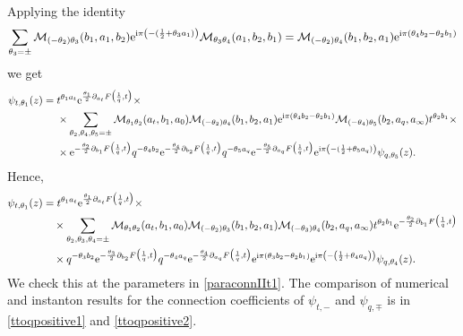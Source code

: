 \documentclass[11pt]{article}
\numberwithin{equation}{section}
\newcommand{\ri}{{\rm i}}
\newcommand{\E}{{\mathrm e}}
\begin{document}
Applying the identity
\begin{equation}
    \sum_{\theta_3=\pm}\mathcal{M}_{(-\theta_2)\theta_3}(b_1,a_1,b_2)\E^{\ri\pi\left(-(\frac1 2+\theta_3 a_1)\right)}\mathcal{M}_{\theta_3\theta_4}(a_1,b_2,b_1)=\mathcal{M}_{(-\theta_2)\theta_4}(b_1,b_2,a_1)\E^{\ri\pi(\theta_4 b_2-\theta_2 b_1)}
\end{equation}
we get
\begin{equation}
\begin{aligned}
\psi_{t,\theta_1}(z)
&=t^{\theta_1 a_t}\E^{\frac{\theta_1}{2}\partial_{a_t}F\big({1\over q},t\big)}\times\\
&\quad\ \times\sum_{\theta_2,\theta_4,\theta_5=\pm}\mathcal{M}_{\theta_1\theta_2}(a_t,b_1,a_0)\mathcal{M}_{(-\theta_2)\theta_4}(b_1,b_2,a_1)\E^{\ri\pi(\theta_4 b_2-\theta_2 b_1)}\mathcal{M}_{(-\theta_4)\theta_5}(b_2,a_q,a_\infty) t^{\theta_2 b_1}\times\\
&\quad\ \times \E^{-\frac{\theta_2}{2}\partial_{b_1}F\big({1\over q},t\big)} q^{-\theta_4 b_2}\E^{-\frac{\theta_4}{2}\partial_{b_2}F\big({1\over q},t\big)}q^{-\theta_5 a_q}\E^{-\frac{\theta_5}{2}\partial_{a_q}F\big({1\over q},t\big)}\E^{\ri\pi\left(-(\frac1 2 +\theta_5 a_q)\right)}\psi_{q,\theta_5}(z).
\end{aligned}
\end{equation}
Hence,
\begin{equation}\label{connIItq}
\begin{aligned}
\psi_{t,\theta_1}(z)
&= t^{\theta_1 a_t} \E^{\frac{\theta_1}{2}\partial_{a_t}F\big({1\over q},t\big)} \times \\
&\quad \times \sum_{\theta_2,\theta_3,\theta_4=\pm} 
\mathcal{M}_{\theta_1\theta_2}(a_t,b_1,a_0) 
\mathcal{M}_{(-\theta_2)\theta_3}(b_1,b_2,a_1) 
\mathcal{M}_{(-\theta_3)\theta_4}(b_2,a_q,a_\infty) 
t^{\theta_2 b_1} 
\E^{-\frac{\theta_2}{2}\partial_{b_1}F\big({1\over q},t\big)} \\
&\quad \times q^{-\theta_3 b_2} 
\E^{-\frac{\theta_3}{2}\partial_{b_2}F\big({1\over q},t\big)} 
q^{-\theta_4 a_q} 
\E^{-\frac{\theta_4}{2}\partial_{a_q}F\big({1\over q},t\big)} 
\E^{\ri\pi\left(\theta_3 b_2 - \theta_2 b_1\right)} 
\E^{\ri\pi\left(-\left(\frac{1}{2} + \theta_4 a_q\right)\right)} 
\psi_{q,\theta_4}(z).
\end{aligned}
\end{equation}
%
We check this at the parameters in \eqref{paraconnIIt1}.
%
The comparison of numerical and instanton results for the connection coefficients of $\psi_{t,-}$ and $\psi_{q,\mp}$ is in \autoref{ttoqpositive1} and \autoref{ttoqpositive2}.
\end{document}
